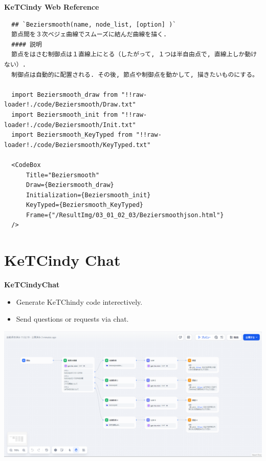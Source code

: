 \documentclass[dvipdfmx, unicode]{beamer}
\begin{document}
\begin{frame}[fragile]{\bfseries KeTCindy Web Reference}
  \begin{lstlisting}
  ## `Beziersmooth(name, node_list, [option] )`
  節点間を３次ベジェ曲線でスムーズに結んだ曲線を描く.
  #### 説明
  節点をはさむ制御点は１直線上にとる（したがって, １つは半自由点で, 直線上しか動けない）.
  制御点は自動的に配置される. その後, 節点や制御点を動かして, 描きたいものにする。  

  import Beziersmooth_draw from "!!raw-loader!./code/Beziersmooth/Draw.txt"
  import Beziersmooth_init from "!!raw-loader!./code/Beziersmooth/Init.txt"
  import Beziersmooth_KeyTyped from "!!raw-loader!./code/Beziersmooth/KeyTyped.txt"

  <CodeBox 
      Title="Beziersmooth"
      Draw={Beziersmooth_draw}
      Initialization={Beziersmooth_init}
      KeyTyped={Beziersmooth_KeyTyped}
      Frame={"/ResultImg/03_01_02_03/Beziersmoothjson.html"}
  />
  \end{lstlisting}
\end{frame}

\section{KeTCindy Chat}

\begin{frame}[t]{\bfseries KeTCindyChat}
  \begin{itemize}
    \item Generate KeTChindy code interectively.
    \item Send questions or requests via chat.
  \end{itemize}
  \includegraphics[width=\linewidth]{img/KeTCindyChat/appabout.png}
\end{frame}
\end{document}

